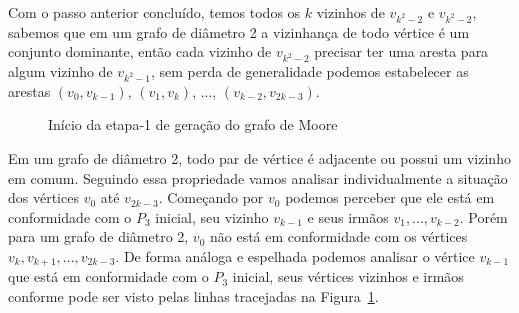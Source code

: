 Com o passo anterior concluído, temos todos os $k$ vizinhos de $v_{k^2-2}$ e $v_{k^2-2}$, sabemos que em um grafo de diâmetro 2 a vizinhança de todo vértice é um conjunto dominante, então cada vizinho de $v_{k^2-2}$ precisar ter uma aresta para algum vizinho de $v_{k^2-1}$, sem perda de generalidade podemos estabelecer as arestas $(v_0,v_{k-1})$, $(v_1,v_k)$, ..., $(v_{k-2},v_{2k-3})$.


\begin{figure}[h]
\centering
{}
\caption{Início da etapa-1 de geração do grafo de Moore}
\label{fig-execucao-moore}
\end{figure}

Em um grafo de diâmetro 2, todo par de vértice é adjacente ou possui um vizinho em comum. Seguindo essa propriedade vamos analisar individualmente a situação dos vértices $v_0$ até $v_{2k-3}$. Começando por $v_0$ podemos perceber que ele está em conformidade com o $P_3$ inicial, seu vizinho $v_{k-1}$ e seus irmãos $v_1,...,v_{k-2}$. Porém para um grafo de diâmetro 2, $v_0$ não está em conformidade com os vértices $v_k,v_{k+1},...,v_{2k-3}$. De forma análoga e espelhada podemos analisar o vértice $v_{k-1}$ que está em conformidade com  o $P_3$ inicial, seus vértices vizinhos e irmãos  conforme pode ser visto pelas linhas tracejadas na Figura~\ref{fig-execucao-moore}.

